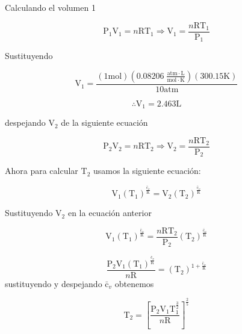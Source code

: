 \documentclass[12pt]{article}
\begin{document}
Calculando el volumen 1

\begin{displaymath}
	\mathrm{P}_1\mathrm{V}_1=n\mathrm{R}\mathrm{T}_1\Rightarrow \mathrm{V}_1=\frac{n\mathrm{R}\mathrm{T}_1}{\mathrm{P}_1}
\end{displaymath}

Sustituyendo

\begin{displaymath}
	\mathrm{V}_1=\frac{\left( 1\mathrm{mol} \right) \left( 0.08206\; \frac{\mathrm{atm}\cdot\mathrm{L}}{\mathrm{mol}\cdot\mathrm{K}} \right)\left( 300.15\mathrm{K} \right)}{10\mathrm{atm}}
\end{displaymath}

\begin{displaymath}
	\therefore\mathrm{V}_1=2.463\mathrm{L}
\end{displaymath}

despejando $\mathrm{V}_2$ de la siguiente ecuación 

\begin{displaymath}
	\mathrm{P}_2\mathrm{V}_2=n\mathrm{R}\mathrm{T}_2\Rightarrow \mathrm{V}_2=\frac{n\mathrm{R}\mathrm{T}_2}{\mathrm{P}_2}
\end{displaymath}

Ahora para calcular $\mathrm{T}_2$ usamos la siguiente ecuación:

\begin{displaymath}
	\mathrm{V}_1(\mathrm{T}_1)^{\frac{\mathrm{\bar{c}}_v}{\mathrm{R}}}= \mathrm{V}_2(\mathrm{T}_2)^{\frac{\mathrm{\bar{c}}_v}{\mathrm{R}}}
\end{displaymath}

Sustituyendo $\mathrm{V}_2$ en la ecuación anterior

\begin{displaymath}
	\mathrm{V}_1(\mathrm{T}_1)^{\frac{\mathrm{\bar{c}}_v}{\mathrm{R}}}=\frac{n\mathrm{R}\mathrm{T}_2}{\mathrm{P}_2}(\mathrm{T}_2)^{\frac{\mathrm{\bar{c}}_v}{\mathrm{R}}}
\end{displaymath}

\begin{displaymath}
	\frac{\mathrm{P}_2\mathrm{V}_1(\mathrm{T}_1)^{\frac{\mathrm{\bar{c}}_v}{\mathrm{R}}}}{n\mathrm{R}}=(\mathrm{T}_2)^{1+\frac{\mathrm{\bar{c}}_v}{\mathrm{R}}}
\end{displaymath}
\newpage
sustituyendo y despejando $\mathrm{\bar{c}}_v$ obtenemos

\begin{displaymath}
	\mathrm{T}_2=\left[ \frac{\mathrm{P}_2\mathrm{V}_1\mathrm{T}_1^{\frac{3}{2}}}{n\mathrm{R}} \right]^{\frac{2}{5}}
\end{displaymath}
\end{document}
